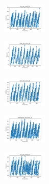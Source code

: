 \begin{figure}[H]    
    \centering
    \begin{subfigure}
        \centering
        \includegraphics[width=0.234\textwidth]{img/bmb/iris_set_const_20_949004259_time.png}
    \end{subfigure}
    \hfill
    \begin{subfigure}
        \centering
        \includegraphics[width=0.234\textwidth]{img/bmb/ecoli_set_const_20_949004259_time.png}
    \end{subfigure}
    \hfill
    \begin{subfigure}
        \centering
        \includegraphics[width=0.234\textwidth]{img/bmb/rand_set_const_20_949004259_time.png}
    \end{subfigure}
    \hfill
    \begin{subfigure}
        \centering
        \includegraphics[width=0.234\textwidth]{img/bmb/newthyroid_set_const_20_949004259_time.png}
    \end{subfigure}
    \hfill
    \begin{subfigure}
        \centering
        \includegraphics[width=0.234\textwidth]{img/bmb/iris_set_const_20_589741062_time.png}
    \end{subfigure}
    \hfill
    \begin{subfigure}

\end{subfigure}
\end{figure}
